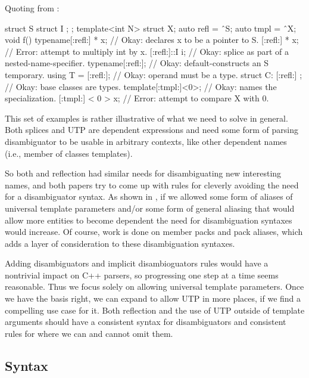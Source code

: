 \documentclass{wg21}
\begin{document}
Quoting from :

\begin{quoteblock}
\begin{colorblock}
struct S { struct I { }; };
template<int N> struct X;
auto refl = ˆS;
auto tmpl = ˆX;
void f() {
    typename[:refl:] * x; // Okay: declares x to be a pointer to S.
    [:refl:] * x; // Error: attempt to multiply int by x.
    [:refl:]::I i; // Okay: splice as part of a nested-name-specifier.
    typename[:refl:]{}; // Okay: default-constructs an S temporary.
    using T = [:refl:]; // Okay: operand must be a type.
    struct C: [:refl:] {}; // Okay: base classes are types.
    template[:tmpl:]<0>; // Okay: names the specialization.
    [:tmpl:] < 0 > x; // Error: attempt to compare X with 0.
}
\end{colorblock}
\end{quoteblock}

This set of examples is rather illustrative of what we need to solve in general.
Both splices and UTP are dependent expressions and need some form of parsing disambiguator to be usable
in arbitrary contexts, like other dependent names (i.e., member of classes templates).

So both  and reflection had similar needs for disambiguating new interesting names, and
both papers try to come up with rules for cleverly avoiding the need for a disambiguator syntax.
As shown in , if we allowed some form of aliases of universal template parameters and/or some form of general aliasing that would allow more entities to become dependent
the need for disambiguation syntaxes would increase.
Of course, work is done on member packs and pack aliases, which adds a layer of consideration to these disambiguation syntaxes.

Adding disambiguators and implicit disambioguators rules would have a nontrivial impact on C++ parsers, so progressing one step at a time seems reasonable.
Thus we focus solely on allowing universal template parameters. Once we have the basis right, we can expand to
allow UTP in more places, if we find a compelling use case for it. Both reflection and the use of UTP outside of template arguments should have a consistent syntax for disambiguators and consistent rules for where we can and cannot omit them.

\subsection{Syntax}
\end{document}
